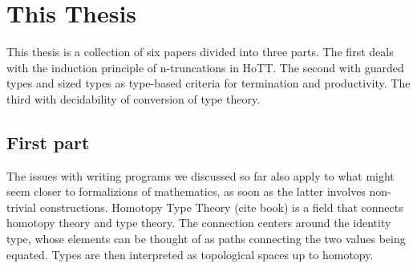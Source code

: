 \documentclass{book}
\begin{document}
\section{This Thesis}
  
This thesis is a collection of six papers divided into three parts.
The first deals with the induction principle of n-truncations in HoTT.
The second with guarded types and sized types as type-based criteria
for termination and productivity. The third with decidability of
conversion of type theory.

\subsection{First part}
The issues with writing programs we discussed so far also apply to
what might seem closer to formalizions of mathematics, as soon as the
latter involves non-trivial constructions.
Homotopy Type Theory (cite book) is a field that connects homotopy theory and type theory.
The connection centers around the identity type, whose elements can be
thought of as paths connecting the two values being equated. Types are
then interpreted as topological spaces up to homotopy.
\end{document}
